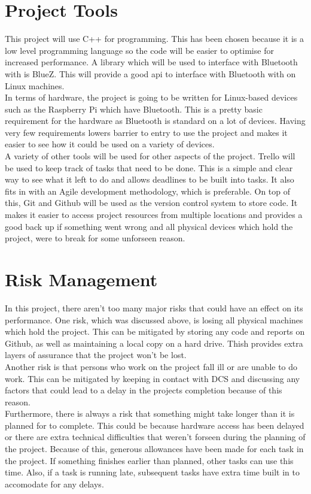 \documentclass{report}
\begin{document}
\section*{Project Tools}

This project will use C++ for programming. This has been chosen because it is a low level programming language 
so the code will be easier to optimise for increased performance. A library which will be used to interface with Bluetooth with is BlueZ\cite{bluez}. This will 
provide a good api to interface with Bluetooth with on Linux machines.
\bigskip\\
In terms of hardware, the project is going to be written for Linux-based devices such as the Raspberry Pi which have 
Bluetooth. This is a pretty basic requirement for the hardware as Bluetooth is standard on a lot of devices. Having 
very few requirements lowers barrier to entry to use the project and makes it easier to see how it could 
be used on a variety of devices. 
\bigskip\\
A variety of other tools will be used for other aspects of the project. Trello will be used to keep track of tasks that 
need to be done. This is a simple and clear way to see what it left to do and allows deadlines to be built into tasks. It 
also fits in with an Agile development methodology, which is preferable. On top of this, Git and Github will be used as the version 
control system to store code. It makes it easier to access project resources from multiple locations and provides a good back 
up if something went wrong and all physical devices which hold the project, were to break for some unforseen reason. 

\section*{Risk Management}

In this project, there aren't too many major risks that could have an effect on its performance. One risk, which was discussed 
above, is losing all physical machines which hold the project. This can be mitigated by storing any code and reports on Github, 
as well as maintaining a local copy on a hard drive. Thish provides extra layers of assurance that the project won't be lost. 
\bigskip\\
Another risk is that persons who work on the project fall ill or are unable to do work. This can be mitigated by keeping in 
contact with DCS and discussing any factors that could lead to a delay in the projects completion because of this reason.
\bigskip\\
Furthermore, there is always a risk that something might take longer than it is planned for to complete. This could be because hardware 
access has been delayed or there are extra technical difficulties that weren't forseen during the planning of the project. Because of this, 
generous allowances have been made for each task in the project. If something finishes earlier than planned, other tasks can use this time. 
Also, if a task is running late, subsequent tasks have extra time built in to accomodate for any delays.
\end{document}
